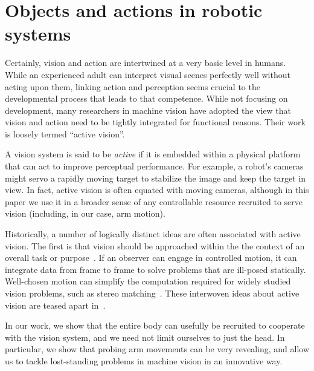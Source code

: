 \section{Objects and actions in robotic systems}

Certainly, vision and action are intertwined at a very basic level in
humans.  While an experienced adult can interpret visual scenes
perfectly well without acting upon them, linking action and perception
seems crucial to the developmental process that leads to that
competence.  While not focusing on development, many researchers in
machine vision have adopted the view that vision and action need to be
tightly integrated for functional reasons.  Their work is loosely
termed ``active vision''.

A vision system is said to be {\em active} if it is embedded within a
physical platform that can act to improve perceptual performance.  For
example, a robot's cameras might servo a rapidly moving target to
stabilize the image and keep the target in view.  In fact, active
vision is often equated with moving cameras, although in this paper we
use it in a broader sense of any controllable resource recruited to
serve vision (including, in our case, arm motion).

Historically, a number of logically distinct ideas are often
associated with active vision.  The first is that vision should be
approached within the the context of an overall task or
purpose~\cite{aloimonos87active}.  If an observer can engage in
controlled motion, it can integrate data from frame to frame to solve
problems that are ill-posed statically.  Well-chosen motion can
simplify the computation required for widely studied vision problems,
such as stereo matching~\cite{bajcsy88active,ballard91animate}.  These
interwoven ideas about active vision are teased apart
in~\cite{tarr94computational}.  

In our work, we show that the entire body can usefully be recruited to
cooperate with the vision system, and we need not limit ourselves to
just the head.  In particular, we show that probing arm movements
can be very revealing, and allow us to tackle lost-standing problems 
in machine vision in an innovative way.

